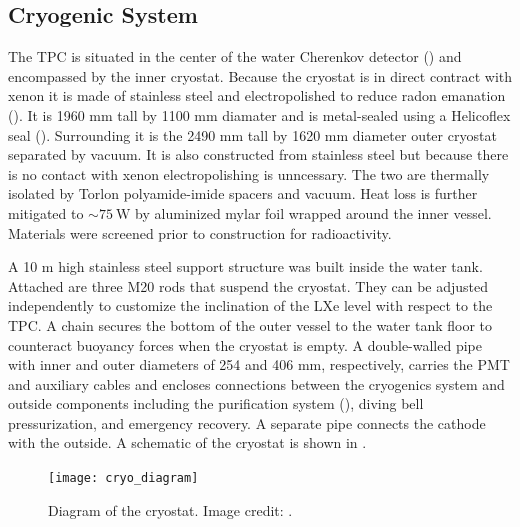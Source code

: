 \subsection{Cryogenic System}
\label{subsec:xenon1t_cryo}
The TPC is situated in the center of the water Cherenkov detector () and encompassed by the inner
cryostat.  Because the cryostat is in direct contract with xenon it is made of stainless steel and electropolished to reduce radon
emanation ().  It is 1960 mm tall by 1100 mm diamater and is metal-sealed
using a Helicoflex seal ().  Surrounding it is the 2490 mm tall by 1620 mm diameter outer cryostat separated by
vacuum.  It is also constructed from stainless steel but
because there is no contact with xenon electropolishing is unncessary.  The two are thermally isolated by Torlon polyamide-imide spacers
and vacuum.  Heat loss is further mitigated to ${\sim} 75\ \mathrm{W}$ by aluminized mylar foil wrapped around the inner
vessel.  Materials were screened prior to construction for
radioactivity.

A 10 m high stainless steel support structure was built inside the water tank.  Attached are three M20 rods that suspend the
cryostat.  They can be adjusted independently to customize the inclination of the LXe level with respect to the
TPC.  A chain secures the bottom of the outer vessel to the water tank floor to counteract buoyancy forces when the cryostat is empty.  A
double-walled pipe with inner and outer diameters of 254 and 406 mm, respectively, carries the PMT and auxiliary cables and encloses
connections between the cryogenics system and outside components including the purification system
(), diving bell pressurization, and emergency recovery.  A separate pipe connects the
cathode with the outside.  A schematic of the cryostat is shown in .

\begin{figure}
\centering
\texttt{[image: cryo\_diagram]}
\caption{Diagram of the cryostat.  Image credit: .}
\label{fig:xenon1t_cryo_cryostat_diagram}
\end{figure}

